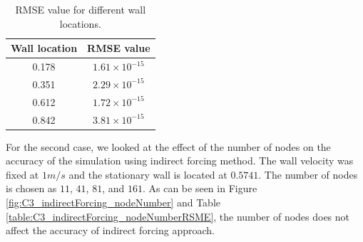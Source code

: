 \begin{table}[H]
\centering
\begin{tabular}{c | c}
     Wall location & RMSE value \\ \hline \hline
     0.178 & $1.61 \times 10^{-15}$ \\ \hline
     0.351 & $2.29 \times 10^{-15}$ \\ \hline
     0.612 & $1.72 \times 10^{-15}$ \\ \hline
     0.842 & $3.81 \times 10^{-15}$
\end{tabular}
\caption{RMSE value for different wall locations.}
\label{table:C3_indirectForcing_wallLocationRSME}
\end{table}

For the second case, we looked at the effect of the number of nodes on the accuracy of the simulation using indirect forcing method. The wall velocity was fixed at $1 m/s$ and the stationary wall is located at $0.5741$. The number of nodes is chosen as $11$, $41$, $81$, and $161$. As can be seen in Figure \ref{fig:C3_indirectForcing_nodeNumber} and Table \ref{table:C3_indirectForcing_nodeNumberRSME}, the number of nodes does not affect the accuracy of indirect forcing approach.

